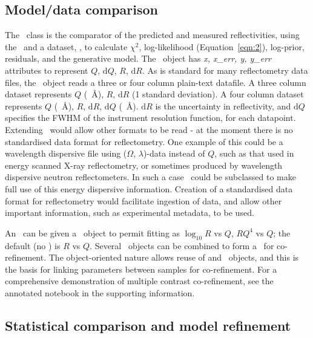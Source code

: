 \documentclass[pdf,preprint]{iucr}
\begin{document}
\subsection{Model/data comparison}
The \Objective\ class is the comparator of the predicted and measured reflectivities, using the \ReflectModel\ and a dataset, \DataD, to calculate $\chi^2$, log-likelihood (Equation~\ref{eqn:2}), log-prior, residuals, and the generative model.
The \DataD\ object has \emph{x, x\_err, y, y\_err} attributes to represent $Q$, $\mathrm{d}Q$, $R$, $\mathrm{d}R$. As is standard for many reflectometry data files, the \DataD\ object reads a three or four column plain-text datafile. A three column dataset represents $Q$ (\si{\per\angstrom}), $R$, $\mathrm{d}R$ (1 standard deviation). A four column dataset represents $Q$ (\si{\per\angstrom}), $R$, $\mathrm{d}R$, $\mathrm{d}Q$ (\si{\per\angstrom}).
$\mathrm{d}R$ is the uncertainty in reflectivity, and $\mathrm{d}Q$ specifies the FWHM of the instrument resolution function, for each datapoint.
Extending \DataD\ would allow other formats to be read - at the moment there is no standardised data format for reflectometry.  One example of this could be a wavelength dispersive file using ($\Omega$, $\lambda$)-data instead of $Q$, such as that used in energy scanned X-ray reflectometry, or sometimes produced by wavelength dispersive neutron reflectometers. In such a case \ReflectModel\ could be subclassed to make full use of this energy dispersive information.
Creation of a standardised data format for reflectometry would facilitate ingestion of data, and allow other important information, such as experimental metadata, to be used.

An \Objective\ can be given a \Transform\ object to permit fitting as $\log_{10} R$ vs $Q$, $RQ^4$ vs $Q$; the default (no \Transform) is $R$ vs $Q$. Several \Objective\ objects can be combined to form a \GlobalObjective\ for co-refinement. The object-oriented nature allows reuse of \Parameter and \Component\ objects, and this is the basis for linking parameters between samples for co-refinement. For a comprehensive demonstration of multiple contrast co-refinement, see the annotated notebook in the supporting information.

\subsection{Statistical comparison and model refinement}
\end{document}
